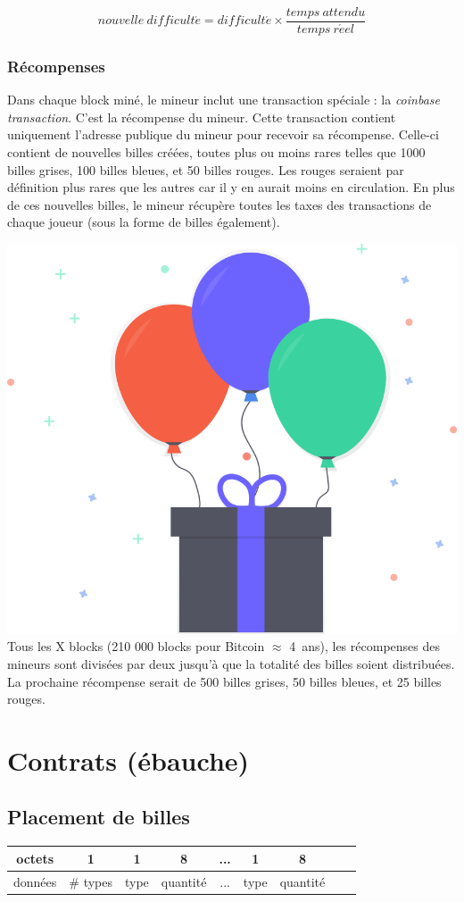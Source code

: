 \documentclass{article}
\begin{document}
\[ nouvelle\ difficult\acute{e} = difficult\acute{e} \times \frac{temps\ attendu}{temps\ r\acute{e}el} \]

\subsubsection{Récompenses}
Dans chaque block miné, le mineur inclut une transaction spéciale : la \textit{coinbase transaction}. C'est la récompense du mineur.
Cette transaction contient uniquement l'adresse publique du mineur pour recevoir sa récompense.
Celle-ci contient de nouvelles billes créées, toutes plus ou moins rares telles que 1000 billes grises, 100 billes bleues, et 50 billes rouges. Les rouges seraient par définition plus rares que les autres car il y en aurait moins en circulation.
En plus de ces nouvelles billes, le mineur récupère toutes les taxes des transactions de chaque joueur (sous la forme de billes également).

\includegraphics[width=0.3\linewidth]{assets/gift.png}\\

Tous les X blocks (210 000 blocks pour Bitcoin $\approx$ 4\ ans), les récompenses des mineurs sont divisées par deux jusqu'à que la totalité des billes soient distribuées.
La prochaine récompense serait de 500 billes grises, 50 billes bleues, et 25 billes rouges.

\newpage
\section{Contrats (ébauche)}
\subsection*{Placement de billes}
\hspace*{-1cm}%
\begin{tabular}{ |c|c|c|c|c|c|c|c|c| } 
 \hline
octets & 1 & 1 & 8 & ... & 1 & 8\\ 
 \hline
    données & \# types & type & quantité & ... & type & quantité \\ 
 \hline
\end{tabular}
\end{document}
